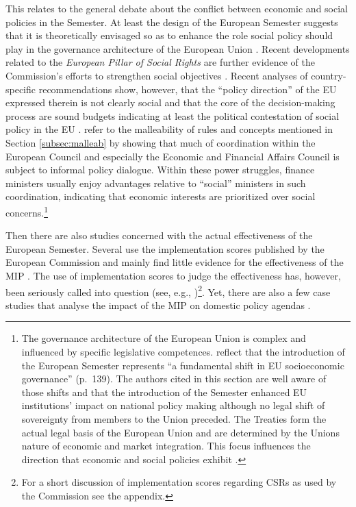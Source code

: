 \documentclass[
]{article}
\begin{document}
This relates to the general debate about the conflict between economic and
social policies in the Semester. At least the design of the European Semester
suggests that it is theoretically envisaged so as to enhance the role social
policy should play in the governance architecture of the European Union
\citep{Verdun2018}. Recent developments related to the \emph{European Pillar of Social Rights} are further evidence of the Commission's efforts to strengthen social objectives \citep{EuropeanCommission:pillar}.
Recent analyses of country-specific recommendations show,
however, that the \enquote{policy direction} of the EU expressed therein is not clearly
social \citep{Haas2020} and that the core of the decision-making process are
sound budgets indicating
at least the political contestation of social policy in the EU
\citep{Copeland2018, Bekker2018}.
\citet{Maricut2018} refer to the malleability of
rules and concepts mentioned in Section \ref{subsec:malleab} by showing that much of coordination within the European Council and especially the Economic and Financial Affairs Council is subject to informal policy dialogue.
Within these power struggles, finance ministers usually enjoy advantages
relative to \enquote{social} ministers in such coordination, indicating that economic
interests are prioritized over social concerns.\footnote{The
  governance architecture of the European Union is complex and influenced by
  specific legislative competences. \citet{Verdun2018} reflect that the
  introduction of the European Semester represents \enquote{a fundamental shift in EU
  socioeconomic governance} (p.~139). The authors cited in this section
  are well aware of those shifts and that the introduction of the Semester enhanced
  EU institutions' impact on national policy making although no legal
  shift of sovereignty from members to the Union preceded. The Treaties form the
  actual legal basis of the European Union and are determined by the Unions nature
  of economic and market integration. This focus influences the direction that economic
  and social policies exhibit \citep{Copeland2018}.}

Then there are also studies concerned with the actual effectiveness of the
European Semester. Several use the implementation scores published by the
European Commission and mainly
find little evidence for the effectiveness of the MIP
\citep{bruegel:2019,bruegel:2018, bruegel:2015, DerooseGriesse:2014, Hradisky:2017, Hradisky:2016}.
The use of implementation scores to judge the effectiveness has, however, been
seriously called into question (see, e.g., \citet{Bokhorst:2019})\footnote{For a short
  discussion of implementation scores regarding CSRs as used by the Commission see
  the appendix.}.
Yet, there are also a few case studies that analyse the impact of the MIP on
domestic policy agendas
\citep[for more details see, e.g.,][]{Bokhorst:2019, Maatsch:2017, Eihmanis:2017, Louvaris:2018, Schreiber:2017, Schulten:2015}.
\end{document}
